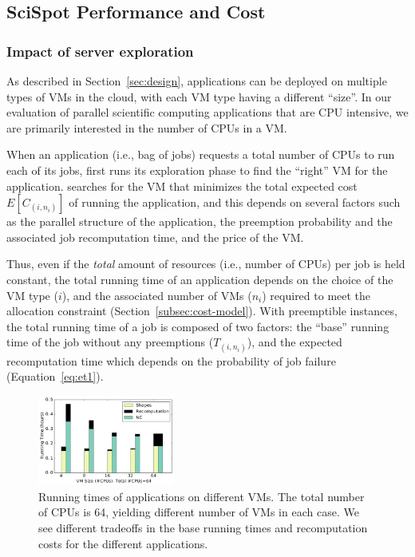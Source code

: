 \vspace*{\subsecspace}
\subsection{SciSpot Performance and Cost}

\subsubsection{Impact of server exploration}

As described in Section~\ref{sec:design}, applications can be deployed on multiple types of VMs in the cloud, with each VM type having a different ``size''.
In our evaluation of parallel scientific computing applications that are CPU intensive, we are primarily interested in the number of CPUs in a VM.

When an application (i.e., bag of jobs) requests a total number of CPUs to run each of its jobs, \sysname first runs its exploration phase to find the ``right'' VM for the application.
\sysname searches for the VM that minimizes the total expected cost $E[C_{(i,n_i)}]$ of running the application, and this depends on several factors such as the parallel structure of the application, the preemption probability and the associated job recomputation time, and the price of the VM.

Thus, even if the \emph{total} amount of resources (i.e., number of CPUs) per job is held constant, the total running time of an application depends on the choice of the VM type ($i$), and the associated number of VMs ($n_i$) required to meet the allocation constraint (Section~\ref{subsec:cost-model}).
%
With preemptible instances, the total running time of a job is composed of two factors: the ``base'' running time of the job without any preemptions ($T_{(i,n_i)}$), and the expected recomputation time which depends on the probability of job failure (Equation~\ref{eq:et1}). 

\begin{figure}
  \centering
  \includegraphics[width=0.4\textwidth]{../graphs/runtime-bars.pdf}
      \vspace*{\myfigspace}
  \caption{Running times of applications on different VMs. The total number of CPUs is 64, yielding different number of VMs in each case. We see different tradeoffs in the base running times and recomputation costs for the different applications.}
  \label{fig:runtimes-bar}
    \vspace*{\myfigspace}
\end{figure}


